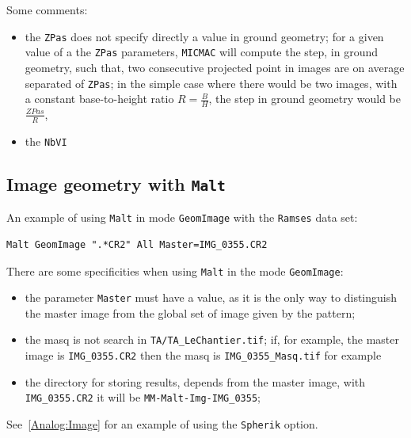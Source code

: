 Some comments:

\begin{itemize}
   \item  the {\tt ZPas} does not specify directly a value in ground geometry;
         for a given value of a the {\tt ZPas} parameters,  {\tt MICMAC} will compute 
         the step, in ground geometry, such that, two consecutive projected point in images are 
         on average separated of {\tt ZPas};
         in the simple case where there would be two images, with a constant base-to-height ratio $R=\frac{B}{H}$,
         the step in ground geometry would be $\frac{ZPas}{R}$, 


   \item the {\tt NbVI}
\end{itemize}

\subsection{Image geometry with {\tt Malt}}

An example of using {\tt Malt} in mode {\tt GeomImage} 
with the {\tt Ramses} data set:

\begin{verbatim}
Malt GeomImage ".*CR2" All Master=IMG_0355.CR2
\end{verbatim}

There are some specificities when using {\tt Malt} in the mode {\tt GeomImage}:

\begin{itemize}
   \item  the parameter {\tt Master} must have a value, as it is the only way to
          distinguish the master image from the global set of image given by the pattern;
   \item the masq is not search in {\tt TA/TA\_LeChantier.tif}; if, for example, 
         the master  image is {\tt IMG\_0355.CR2} then the masq is {\tt IMG\_0355\_Masq.tif}
         for example
   \item the directory for storing results, depends from the master image, with {\tt IMG\_0355.CR2}
         it will be  {\tt MM-Malt-Img-IMG\_0355};
          
\end{itemize}


See~\ref{Analog:Image} for an example of using the {\tt Spherik} option.





